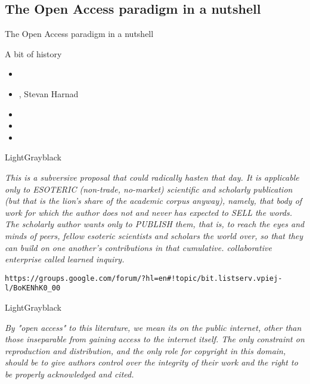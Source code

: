 \documentclass[10pt,xcolor=svgnames]{beamer}
\begin{document}
\subsection{The Open Access paradigm in a nutshell}
\begin{frame}{The Open Access paradigm in a nutshell}

  \begin{block}{A bit of history}
    \begin{itemize}
      \item<1->[1991] 
      \item<2->[1994] , Stevan Harnad
      \item<3->[2002] 
      \item<4->[2003] 
      \item<5->[2003] 
    \end{itemize}
  \end{block}

  \begin{overprint}
  \begin{colorblock}{LightGray}{black}{}
    {\scriptsize\emph{This is a subversive proposal that could radically hasten that day. It is applicable only to ESOTERIC (non-trade, no-market) scientific and scholarly publication (but that is the lion's share of the academic corpus anyway), namely, that body of work for which the author does not and never has expected to SELL the words. The scholarly author wants only to PUBLISH them, that is, to reach the eyes and minds of peers, fellow esoteric scientists and scholars the world over, so that they can build on one another's contributions in that cumulative. collaborative enterprise called learned inquiry.}

      \texttt{https://groups.google.com/forum/?hl=en\#!topic/bit.listserv.vpiej-l/BoKENhK0\_00}}
  \end{colorblock}

  \begin{colorblock}{LightGray}{black}{}
    {\scriptsize\emph{By "open access" to this literature, we mean its  on the public internet,  other than those inseparable from gaining access to the internet itself. The only constraint on reproduction and distribution, and the only role for copyright in this domain, should be to give authors control over the integrity of their work and the right to be properly acknowledged and cited.}

}
\end{colorblock}
\end{overprint}
\end{frame}
\end{document}
